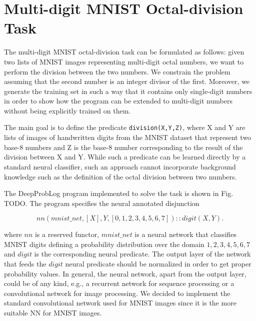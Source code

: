 \section{Multi-digit MNIST Octal-division Task}
\label{sec:task}

The multi-digit MNIST octal-division task can be formulated as follows: given two lists of MNIST images representing multi-digit octal numbers, we want to perform the division between the two numbers. We constrain the problem assuming that the second number is an integer divisor of the first. Moreover, we generate the training set in such a way that it contains only single-digit numbers in order to show how the program can be extended to multi-digit numbers without being explicitly trained on them.

The main goal is to define the predicate \texttt{division(X,Y,Z)}, where X and Y are lists of images of handwritten digits from the MNIST dataset that represent two base-8 numbers and Z is the base-8 number corresponding to the result of the division between X and Y. While such a predicate can be learned directly by a standard neural classifier, such an approach cannot incorporate background knowledge such as the definition of the octal division between two numbers.

The DeepProbLog program implemented to solve the task is shown in Fig. TODO. The program specifies the neural annotated disjunction

\begin{equation}
    nn(mnist\_net,[X],Y,[0,1,2,3,4,5,6,7]) :: digit(X,Y).
\end{equation}

where $nn$ is a reserved functor, $mnist\_net$ is a neural network that classifies MNIST digits defining a probability distribution over the domain ${1,2,3,4,5,6,7}$ 
and $digit$ is the corresponding neural predicate. The output layer of the network that feeds the $digit$ neural predicate should be normalized in order to get proper probability values. In general, the neural network, apart from the output layer, could be of any kind, e.g., a recurrent network for sequence processing or a convolutional network for image processing. We decided to implement the standard convolutional network used for MNIST images since it is the more suitable NN for MNIST images. %

